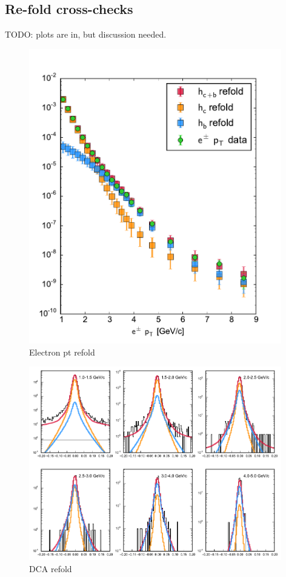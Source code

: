 \documentclass[12pt]{article}
\begin{document}
\subsection{Re-fold cross-checks}
TODO: plots are in, but discussion needed.
\begin{figure}[htb]
  \begin{center}
    \includegraphics[width=0.98\textwidth]{AuAu200MB/2/ept_refold}
  \end{center}
  \caption{Electron pt refold}
  \label{fig:ept-refold}
\end{figure}

\begin{figure}[htb]
  \begin{center}
    \includegraphics[width=0.98\textwidth]{AuAu200MB/2/dca-fold}
  \end{center}
  \caption{DCA refold}
  \label{fig:dca-refold}
\end{figure}
\end{document}
